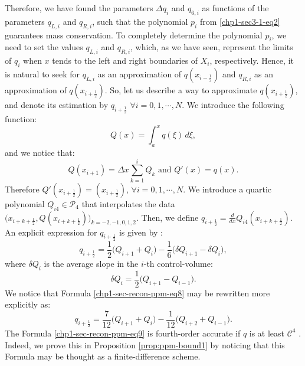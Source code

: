 Therefore, we have found the parameters $\Delta q_i$ and $q_{6, i}$ as
functions of the parameters $q_{L, i}$ and $q_{R, i}$,
such that the polynomial $p_i$ from \eqref{chp1-sec3-1-eq2} 
guarantees mass conservation. To completely determine the 
polynomial $p_i$, we need to set the values $q_{L, i}$ and
$q_{R, i}$, which, as we have seen, represent the limits of $q_i$ when
$x$ tends to the left and right boundaries of $X_i$, respectively.
Hence, it is natural to seek for $q_{L, i}$ as an approximation of $q(x_{i-\frac{1}{2}})$
and $q_{R, i}$ as an approximation of $q(x_{i+\frac{1}{2}})$.
So, let us describe a way to approximate $q(x_{i+\frac{1}{2}})$, and denote its estimation by
$q_{i+\frac{1}{2}}$ $\forall i = 0, 1, \cdots, N$.
We introduce the following function:
\begin{equation}
	\label{chp1-sec-recon-ppm-eq5}
	Q(x) = \int_{a}^{x} q(\xi) \,d\xi,
\end{equation}
and we notice that:
\begin{equation}
	\label{chp1-sec-recon-ppm-eq6}
	Q(x_{i+1}) = \Delta x \sum_{k=1}^{i} Q_k \text{ and } Q'(x) = q(x).
\end{equation}
Therefore $Q'(x_{i+\frac{1}{2}}) = (x_{i+\frac{1}{2}}) $, $\forall i = 0, 1, \cdots, N$.
We introduce a quartic polynomial $Q_{i4} \in \mathcal{P}_4$ that interpolates the data
$\big(x_{i+k+\frac{1}{2}}, Q(x_{i+k+\frac{1}{2}})\big)_{k=-2,-1,0,1,2}$. Then, we define
$q_{i+\frac{1}{2}} = \frac{d}{dx}Q_{i4}(x_{i+k+\frac{1}{2}})$.
An explicit expression for $q_{i+\frac{1}{2}}$ is given by \citep{colella:1984}:
\begin{equation}
	\label{chp1-sec-recon-ppm-eq7}
	q_{i+\frac{1}{2}} = \frac{1}{2} \bigg( Q_{i+1} + Q_{i} \bigg) - \frac{1}{6} \bigg( \delta Q_{i+1} - \delta Q_{i}\bigg),
\end{equation}
where $\delta Q_{i}$ is the average slope in the $i$-th control-volume:
\begin{equation}
	\label{chp1-sec-recon-ppm-eq8}
	\delta Q_{i} = \frac{1}{2} \bigg( Q_{i+1} - Q_{i-1} \bigg).
\end{equation}
We notice that Formula \eqref{chp1-sec-recon-ppm-eq8} may be rewritten more explicitly as:
\begin{equation}
	\label{chp1-sec-recon-ppm-eq9}
	q_{i+\frac{1}{2}} = \frac{7}{12} \bigg( Q_{i+1} + Q_{i} \bigg) - \frac{1}{12} \bigg(  Q_{i+2} +Q_{i-1}\bigg).
\end{equation}
The Formula \eqref{chp1-sec-recon-ppm-eq9} is fourth-order accurate if
$q$ is at least $\mathcal{C}^4$ \citep{colella:1984}. Indeed, we
prove this in Proposition \ref{prop:ppm-bound1} by noticing
that this Formula may be thought as a finite-difference scheme.

